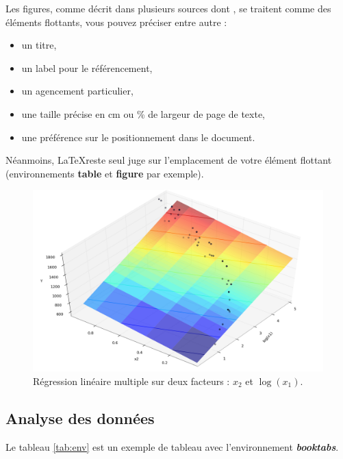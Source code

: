 \documentclass[12pt]{article} %
\begin{document}
Les figures, comme décrit dans plusieurs sources dont \cite{codeco_endemic_2001}, se traitent comme des éléments flottants, vous pouvez préciser entre autre :
\begin{itemize}
	\item un titre,
	\item un label pour le référencement,
	\item un agencement particulier,
	\item une taille précise en cm ou \% de largeur de page de texte,
	\item une préférence sur le positionnement dans le document.
\end{itemize}

Néanmoins, \LaTeX reste seul juge sur l'emplacement de votre élément flottant (environnements \textbf{table} et \textbf{figure} par exemple).

\begin{figure}[ht] %
	\centering
	\includegraphics[width=\textwidth]{image.png}			
	\caption{Régression linéaire multiple sur deux facteurs : $x_2$ et $\log(x_1)$.}
	\label{fig:image}
\end{figure}

\subsection{Analyse des données}

Le tableau \ref{tab:env} est un exemple de tableau avec l'environnement \textbf{\textit{booktabs}}.
\end{document}
